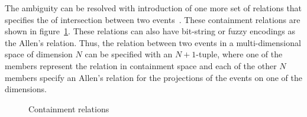 The ambiguity can be resolved with introduction of one more set of relations that specifies the of intersection between two 
events~\cite{Wattamwar:2008}. These containment relations are shown in figure~\ref{fig:clock:containment}. These relations
can also have bit-string or fuzzy encodings as the Allen's relation. Thus, the relation between two events in a multi-dimensional 
space of dimension $N$ can be specified with an $N+1$-tuple, where one of the members represent the relation in containment 
space and each of the other $N$ members specify an Allen's relation for the  projections of the events on one of the dimensions.

\begin{figure}[htbp!]
	\centerline{
	}
	\caption{Containment relations}
	\label{fig:clock:containment}
\end{figure}

